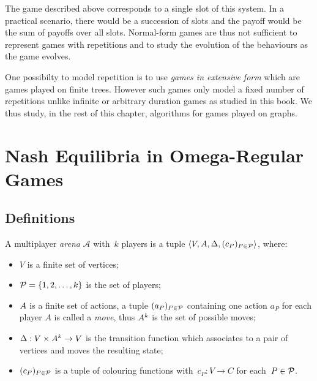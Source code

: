 The game described above corresponds to a single slot of this system. In
a practical scenario, there would be a succession of slots and the payoff would be
the sum of payoffs over all slots. Normal-form games are thus not
sufficient to represent games with repetitions and to study the
evolution of the behaviours as the game evolves.

One possibilty to model repetition is to use
\emph{games in extensive form} which are games played on finite trees.
However such games only model a fixed number of repetitions unlike
infinite or arbitrary duration games as studied in this book. We thus
study, in the rest of this chapter, algorithms for games played on
graphs.

\section{Nash Equilibria in Omega-Regular
Games}\label{nash-equilibria-in-omega-regular-games}

\subsection{Definitions}\label{definition}

\begin{definition}
  A multiplayer \emph{arena} \(\mathcal{A}\) with~$k$ players is a tuple
  \(\langle V, A,\Delta,(c_P)_{P\in \mathcal{P}} \rangle \), where:

  \begin{itemize}

  \item
    \(V\) is a finite set of vertices;
  \item
    \(\mathcal{P} = \{1,2,\ldots,k\}\) is the set of players;
  \item
    \(A\) is a finite set of actions, a tuple \((a_P)_{P \in \mathcal{P}}\)
    containing one action \(a_P\) for each player $A$ is called a
    \emph{move}, thus \(A^k\) is the set of possible moves;
  \item
    \(\Delta : V \times A^k \to V\) is the transition function which
    associates to a pair of vertices and moves the resulting state;
  \item
    \((c_P)_{P \in \mathcal{P}}\) is a tuple of colouring functions
    with~$c_P : V \rightarrow C$ for each~$P \in \mathcal{P}$.
  \end{itemize}
\end{definition}

